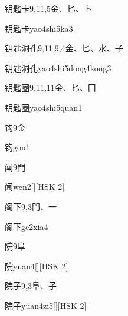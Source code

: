 \begin{entry}{钥匙卡}{9,11,5}{⾦、⼔、⼘}
  \begin{phonetics}{钥匙卡}{yao4shi5ka3}
  \end{phonetics}
\end{entry}

\begin{entry}{钥匙洞孔}{9,11,9,4}{⾦、⼔、⽔、⼦}
  \begin{phonetics}{钥匙洞孔}{yao4shi5dong4kong3}
  \end{phonetics}
\end{entry}

\begin{entry}{钥匙圈}{9,11,11}{⾦、⼔、⼞}
  \begin{phonetics}{钥匙圈}{yao4shi5quan1}
  \end{phonetics}
\end{entry}

\begin{entry}{钩}{9}{⾦}
  \begin{phonetics}{钩}{gou1}
  \end{phonetics}
\end{entry}

\begin{entry}{闻}{9}{⾨}
  \begin{phonetics}{闻}{wen2}[][HSK 2]
  \end{phonetics}
\end{entry}

\begin{entry}{阁下}{9,3}{⾨、⼀}
  \begin{phonetics}{阁下}{ge2xia4}
  \end{phonetics}
\end{entry}

\begin{entry}{院}{9}{⾩}
  \begin{phonetics}{院}{yuan4}[][HSK 2]
  \end{phonetics}
\end{entry}

\begin{entry}{院子}{9,3}{⾩、⼦}
  \begin{phonetics}{院子}{yuan4zi5}[][HSK 2]
  \end{phonetics}
\end{entry}


